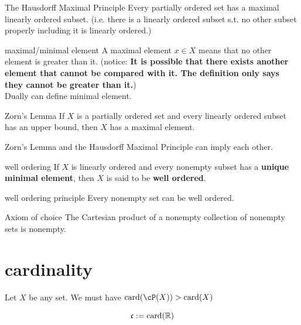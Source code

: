 \documentclass[lang=cn,11pt]{elegantbook}
\begin{document}
\begin{axiom}{The Hausdorff Maximal Principle}\label{The Hausdorff Maximal Principle}
Every partially ordered set has a maximal linearly ordered subset. (i.e. there is a linearly ordered subset s.t. no other subset properly including it is linearly ordered.)
\end{axiom}

\begin{definition}{maximal/minimal element}
    A maximal element $x \in X$ means that no other element is greater than it. (notice: \textbf{It is possible that there exists another element that cannot be compared with it. The definition only says they cannot be greater than it.})\\
    Dually can define minimal element.
\end{definition}
\begin{axiom}{Zorn's Lemma} \label{Zorn's Lemma}
If $X$ is a partially ordered set and every linearly ordered subset has an upper bound, then $X$ has a maximal element.
\end{axiom}
\begin{remark}
    Zorn's Lemma and the Hausdorff Maximal Principle can imply each other.
\end{remark}

\begin{definition}{well ordering}
If $X$ is linearly ordered and every nonempty subset has a \textbf{unique minimal element}, then $X$ is said to be \textbf{well ordered}.
\end{definition}


\begin{lemma}{well ordering principle}
    Every nonempty set can be well ordered.
\end{lemma}

\begin{corollary}{Axiom of choice}
    The Cartesian product of a nonempty collection of nonempty sets is nonempty.
\end{corollary}

\section{cardinality}
\begin{proposition}
    Let $X$ be any set. We must have $\card(\cP(X)) > \card(X)$
\end{proposition}

\begin{definition}
 $$\mathfrak{c} := \operatorname{card}(\mathbb{R})$$
\end{definition}
\end{document}
